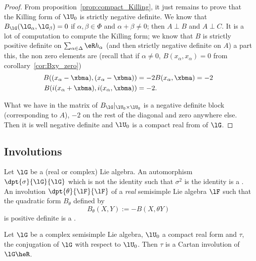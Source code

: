 \begin{proof}
From proposition~\ref{prop:compact_Killing}, it just remains to prove that the Killing form of $\lU_0$ is strictly negative definite. We know that $B_{\lG}(\lG_{\alpha},\lG_{\beta})=0$ if $\alpha,\beta\in\Phi$ and $\alpha+\beta\neq 0$; then $A\perp B$ and $A\perp C$. It is a lot of computation to compute the Killing form; we know that $B$ is strictly positive definite on $\sum_{\alpha\in\Delta}\eR h_{\alpha}$ (and then strictly negative definite on $A$) a part this, the non zero elements are (recall that if $\alpha\neq 0$, $B( x_{\alpha}, x_{\alpha})=0$ from corollary~\ref{cor:Bxy_zero})
\[
\begin{split}
  B( ( x_{\alpha}-\xbma),( x_{\alpha}-\xbma) )&=-2B( x_{\alpha},\xbma)=-2\\
  B(i( x_{\alpha}+\xbma),i( x_{\alpha},\xbma))&=-2.
\end{split}
\]

What we have in the matrix of $B_{\lG}|_{\lU_0\times\lU_0}$ is a negative definite block (corresponding to $A$), $-2$ on the rest of the diagonal and zero anywhere else. Then it is well negative definite and $\lU_0$ is a compact real from of $\lG$.
\end{proof}

\subsection{Involutions}

Let $\lG$ be a (real or complex) Lie algebra. An automorphism $\dpt{\sigma}{\lG}{\lG}$ which is not the identity such that $\sigma^2$ is the identity is a . An involution $\dpt{\theta}{\lF}{\lF}$ of a \emph{real} semisimple Lie algebra $\lF$ such that the quadratic form $B_{\theta}$ defined by
\[
   B_{\theta}(X,Y):=-B(X,\theta Y)
\]
is positive definite is a .

\begin{proposition}
Let $\lG$ be a complex semisimple Lie algebra, $\lU_0$ a compact real form and $\tau$, the conjugation of $\lG$ with respect to $\lU_0$. Then $\tau$ is a Cartan involution of $\lG\heR$.
\label{prop:conj_invol}
\end{proposition}


